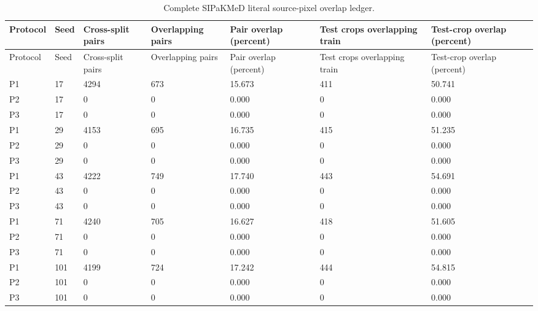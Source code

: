 \begin{longtable}{p{1.4cm}p{1.0cm}p{2.0cm}p{2.0cm}p{2.0cm}p{2.8cm}p{2.3cm}}
\caption{Complete SIPaKMeD literal source-pixel overlap ledger.}\label{tab:pixel-seed-ledger}\\
\toprule
Protocol & Seed & Cross-split pairs & Overlapping pairs & Pair overlap (percent) & Test crops overlapping train & Test-crop overlap (percent) \\
\midrule
\endfirsthead
\toprule
Protocol & Seed & Cross-split pairs & Overlapping pairs & Pair overlap (percent) & Test crops overlapping train & Test-crop overlap (percent) \\
\midrule
\endhead
\bottomrule
\endfoot
P1 & 17 & 4294 & 673 & 15.673 & 411 & 50.741 \\ 
P2 & 17 & 0 & 0 & 0.000 & 0 & 0.000 \\ 
P3 & 17 & 0 & 0 & 0.000 & 0 & 0.000 \\ 
P1 & 29 & 4153 & 695 & 16.735 & 415 & 51.235 \\ 
P2 & 29 & 0 & 0 & 0.000 & 0 & 0.000 \\ 
P3 & 29 & 0 & 0 & 0.000 & 0 & 0.000 \\ 
P1 & 43 & 4222 & 749 & 17.740 & 443 & 54.691 \\ 
P2 & 43 & 0 & 0 & 0.000 & 0 & 0.000 \\ 
P3 & 43 & 0 & 0 & 0.000 & 0 & 0.000 \\ 
P1 & 71 & 4240 & 705 & 16.627 & 418 & 51.605 \\ 
P2 & 71 & 0 & 0 & 0.000 & 0 & 0.000 \\ 
P3 & 71 & 0 & 0 & 0.000 & 0 & 0.000 \\ 
P1 & 101 & 4199 & 724 & 17.242 & 444 & 54.815 \\ 
P2 & 101 & 0 & 0 & 0.000 & 0 & 0.000 \\ 
P3 & 101 & 0 & 0 & 0.000 & 0 & 0.000 \\ 
\end{longtable}
